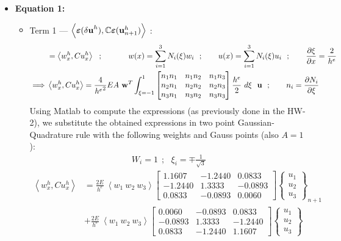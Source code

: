 \begin{itemize}
\item {\bf Equation 1:}
\begin{itemize}
\item Term 1 --- $\left< 
{\bm\varepsilon({\bf \delta u}^h),\mathbb{C}{\bm\varepsilon}({\bf u}^h_{n+1})}
\right>$ : 
\begin{align*}
& = \left< 
w^h_x , C u^h_x
\right> \ \ ; \ \ \ \ \ \ \ \ \ \ w(x) = \sum_{i=1}^3 N_i(\xi) w_i \ \ ; \ \ \ \ \ \  u(x) = \sum_{i=1}^3 N_i(\xi) u_i \ \ ; \ \ \ \ \ \ \del{\xi}{x} = \frac{2}{h^e} \\
\implies 
& \left< 
w^h_x , C u^h_x
\right>
=
\frac{4}{{h^e}^2} EA\ {\bf w}^T
\int_{\xi = -1}^{1}
\begin{bmatrix}
n_1n_1 & n_1n_2 & n_1n_3 \\
n_2n_1 & n_2n_2 & n_2n_3 \\
n_3n_1 & n_3n_2 & n_3n_3  
\end{bmatrix}\frac{h^e}{2}\ d\xi \ \ {\bf u} \ \ ; \ \ \ \ \ \ n_i = \del{N_i}{\xi}
\end{align*}
Using Matlab to compute the expressions (as previously done in the HW-2), we substitute the obtained expressions in two point Gaussian-Quadrature rule with the following weights and Gauss points (also $A = 1$): 
\begin{align*}
W_i = 1\ \ ; \ \ \ \xi_i = \mp \frac{1}{\sqrt{3}}
\end{align*}
\begin{align*}
\left< 
w^h_x , C u^h_x
\right>
& = \frac{2E}{h^e}\ 
\left< w_1\ w_2\ w_3
\right>
\begin{bmatrix}
 1.1607  & -1.2440 &   0.0833\\
 -1.2440 &   1.3333 &  -0.0893\\
 0.0833  &  -0.0893  &  0.0060
\end{bmatrix}
\begin{Bmatrix}
u_1\\u_2\\u_3 
\end{Bmatrix}_{n+1} \\
& + 
\frac{2E}{h^e}\ 
\left< w_1\ w_2\ w_3
\right>
\begin{bmatrix}
0.0060 &  -0.0893  &  0.0833 \\
-0.0893 &   1.3333  & -1.2440 \\
0.0833  & -1.2440   & 1.1607
\end{bmatrix}
\begin{Bmatrix}
u_1\\u_2\\u_3

\end{Bmatrix}
\end{align*}
\end{itemize}
\end{itemize}
